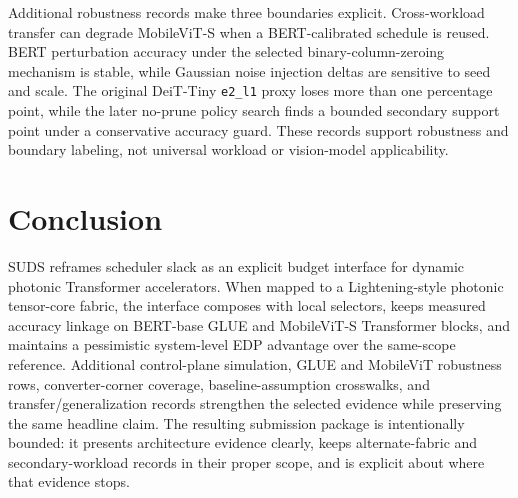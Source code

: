 \documentclass[10pt,journal]{IEEEtran}
\begin{document}
Additional robustness records make three boundaries explicit. Cross-workload
transfer can degrade MobileViT-S when a BERT-calibrated schedule is reused.
BERT perturbation accuracy under the selected binary-column-zeroing mechanism
is stable, while Gaussian noise injection deltas are sensitive to seed and
scale. The original DeiT-Tiny \texttt{e2\_l1} proxy loses more than one
percentage point, while the later no-prune policy search finds a bounded
secondary support point under a conservative accuracy guard. These records
support robustness and boundary labeling, not universal workload or
vision-model applicability.

\section{Conclusion}

SUDS reframes scheduler slack as an explicit budget interface for dynamic
photonic Transformer accelerators. When mapped to a Lightening-style photonic
tensor-core fabric, the interface composes with local selectors, keeps measured
accuracy linkage on BERT-base GLUE and MobileViT-S Transformer blocks, and
maintains a pessimistic system-level EDP advantage over the same-scope
reference. Additional control-plane simulation, GLUE and MobileViT robustness
rows, converter-corner coverage, baseline-assumption crosswalks, and
transfer/generalization records strengthen the selected evidence while
preserving the same headline claim. The resulting submission package is
intentionally bounded: it presents architecture evidence clearly, keeps
alternate-fabric and secondary-workload records in their proper scope, and is
explicit about where that evidence stops.
\end{document}
